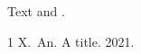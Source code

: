 \documentclass[AMA]{MRM}
\begin{document}
Text \cite{a} and \cite[p.~5]{a}.
\begin{thebibliography}{1}
 X.~An. A title. 2021.
\end{thebibliography}
\end{document}
